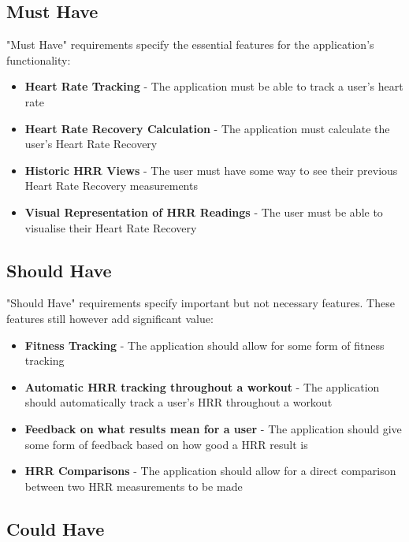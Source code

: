 \documentclass{l4proj}
\begin{document}
\subsection{Must Have}

"Must Have" requirements specify the essential features for the application's functionality:

\begin{itemize}
    \item \textbf{Heart Rate Tracking} - The application must be able to track a user's heart rate
    \item \textbf{Heart Rate Recovery Calculation} - The application must calculate the user's Heart Rate Recovery
    \item \textbf{Historic HRR Views} - The user must have some way to see their previous Heart Rate Recovery measurements
    \item \textbf{Visual Representation of HRR Readings} - The user must be able to visualise their Heart Rate Recovery
\end{itemize}

\subsection{Should Have}

"Should Have" requirements specify important but not necessary features. These features still however add significant value:

\begin{itemize}
    \item \textbf{Fitness Tracking} - The application should allow for some form of fitness tracking
    \item \textbf{Automatic HRR tracking throughout a workout} - The application should automatically track a user's HRR throughout a workout
    \item \textbf{Feedback on what results mean for a user} - The application should give some form of feedback based on how good a HRR result is
    \item \textbf{HRR Comparisons} - The application should allow for a direct comparison between two HRR measurements to be made 
    
\end{itemize}

\subsection{Could Have}
\end{document}
